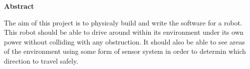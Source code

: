 \thispagestyle{empty}

\begin{center}
    {\LARGE\bf Abstract}
\end{center}
The aim of this project is to physicaly build and write the software for a robot.  This robot should be able to drive around within its environment under its own power without colliding with any obstruction.  It should also be able to see areas of the environment using some form of sensor system in order to determin which direction to travel safely.
